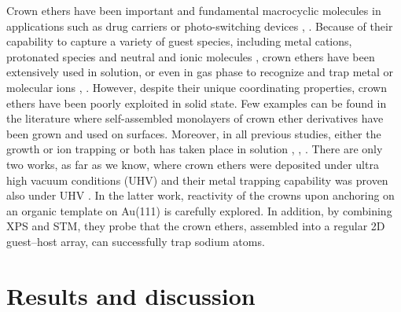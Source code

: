 \documentclass[aps,prl,reprint,longbibliography,superscriptaddress]{revtex4-1}
\begin{document}
Crown ethers have been important and fundamental macrocyclic molecules in applications such as drug carriers \cite{uchegbu_non-ionic_1998} or photo-switching devices \cite{malval_photoswitching_2002}, \cite{uda_membrane_2005}. Because of their capability to capture a variety of guest species, including metal cations, protonated species and neutral and ionic molecules \cite{dobler1980ionophores}, crown ethers \cite{gokel_crown_1991} have been extensively used in solution, or even in gas phase to recognize and trap metal or molecular ions \cite{more_intrinsic_1999}, \cite{maleknia_cavity-size-dependent_2002}. However, despite their unique coordinating properties, crown ethers have been poorly exploited in solid state. Few examples can be found in the literature where self-assembled monolayers of crown ether derivatives have been grown and used on surfaces. Moreover, in all previous studies, either the growth or ion trapping or both has taken place in solution \cite{yoshimoto_hostguest_2003}, \cite{flink_recognition_1999}, \cite{inokuchi_new_2015}. 
 There are only two works, as far as we know, where crown ethers were deposited under ultra high vacuum conditions (UHV) \cite{feng_growth_2018} and their metal trapping capability was proven also under UHV \cite{stredansky_-surface_2019}. In the latter work, reactivity of the crowns upon anchoring on an organic template on Au(111) is carefully explored. In addition, by combining XPS and STM, they probe that the crown ethers, assembled into a regular 2D guest–host array, can successfully trap sodium atoms.

\section{Results and discussion}
\end{document}
